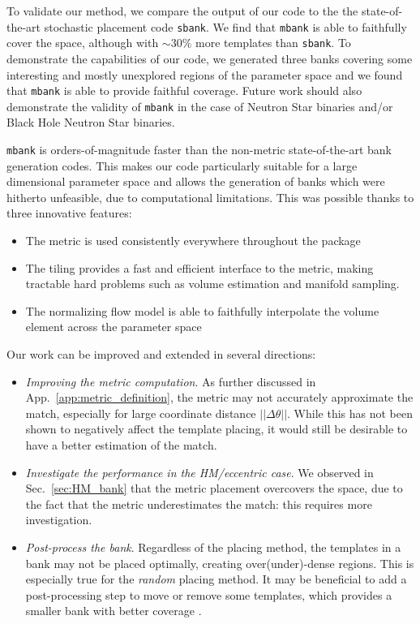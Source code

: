\documentclass[twocolumn,showpacs,preprintnumbers,nofootinbib,prd,
superscriptaddress,10pt]{revtex4-2}
\begin{document}
To validate our method, we compare the output of our code to the the state-of-the-art stochastic placement code \texttt{sbank}. We find that \texttt{mbank} is able to faithfully cover the space, although with $\sim 30\%$ more templates than \texttt{sbank}.
To demonstrate the capabilities of our code, we generated three banks covering some interesting and mostly unexplored regions of the parameter space and we found that \texttt{mbank} is able to provide faithful coverage.
Future work should also demonstrate the validity of \texttt{mbank} in the case of Neutron Star binaries and/or Black Hole Neutron Star binaries.

\texttt{mbank} is orders-of-magnitude faster than the non-metric state-of-the-art bank generation codes.
This makes our code particularly suitable for a large dimensional parameter space and allows the generation of banks which were hitherto unfeasible, due to computational limitations.
This was possible thanks to three innovative features:
\begin{itemize}
	\item The metric is used consistently everywhere throughout the package
	\item The tiling provides a fast and efficient interface to the metric, making tractable hard problems such as volume estimation and manifold sampling.
	\item The normalizing flow model is able to faithfully interpolate the volume element across the parameter space
\end{itemize}

Our work can be improved and extended in several directions:
\begin{itemize}
	\item {\it Improving the metric computation}. As further discussed in App.~\ref{app:metric_definition}, the metric may not accurately approximate the match, especially for large coordinate distance $||\Delta\theta||$. While this has not been shown to negatively affect the template placing, it would still be desirable to have a better estimation of the match.
	
	\item {\it Investigate the performance in the HM/eccentric case}. We observed in Sec.~\ref{sec:HM_bank} that the metric placement overcovers the space, due to the fact that the metric underestimates the match: this requires more investigation.
	
	\item {\it Post-process the bank}. Regardless of the placing method, the templates in a bank may not be placed optimally, creating over(under)-dense regions. This is especially true for the {\it random} placing method. It may be beneficial to add a post-processing step to move or remove some templates, which provides a smaller bank with better coverage \cite{Indik:2017vqq}.
\end{itemize}
\end{document}
